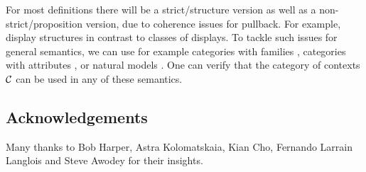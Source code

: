For most definitions there will be a strict/structure version as well as a non-strict/proposition version,
due to coherence issues for pullback.
For example, display structures in contrast to classes of displays.
To tackle such issues for general semantics,
we can use for example categories with families \cite{castellan2020categories},
categories with attributes \cite{JACOBS1993169},
or natural models \cite{awodey2017natural}.
One can verify that the category of contexts $\mathcal{C}$ can be used in any of these semantics.


\subsection{Acknowledgements}
Many thanks to Bob Harper, Astra Kolomatskaia, Kian Cho, Fernando Larrain Langlois and Steve Awodey
for their insights.
